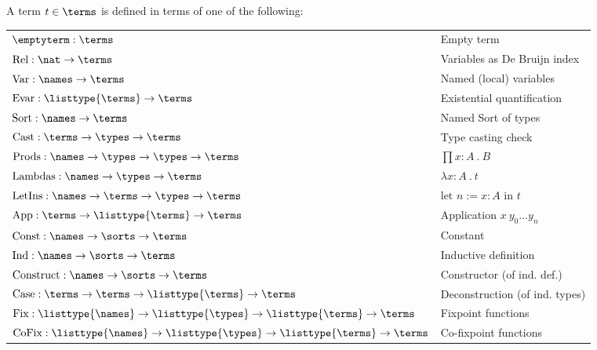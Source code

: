 \begin{definition}
	A \pcic term $t \in \terms$ is defined in terms of one of the following:

	\vspace{1em}
	\begin{tabular}{ll}
		$\emptyterm : \terms$                                        & Empty term\glsadd{emptyterm} \\
		$\text{Rel} : \nat \rightarrow \terms$                       & Variables as De Bruijn \cite{de1972lambda} index \\
		$\text{Var} : \names \rightarrow \terms$                     & Named (local) variables \\
		$\text{Evar} : \listtype{\terms} \rightarrow \terms $        & Existential quantification \\
		$\text{Sort} : \names \rightarrow \terms$                    & Named Sort of types \\
		$\text{Cast} : \terms \rightarrow \types \rightarrow \terms$ & Type casting check \\
		$\text{Prods} : \names \rightarrow \types \rightarrow \types \rightarrow \terms $ & $\prod x:A ~.~ B$ \\
		$\text{Lambdas} : \names \rightarrow \types \rightarrow \terms$   & $\lambda x:A ~.~ t$ \\
		$\text{LetIns} : \names \rightarrow \terms \rightarrow \types \rightarrow \terms$    & $\text{let~} n := x : A \text{~in~} t$ \\
		$\text{App} : \terms \rightarrow \listtype{\terms} \rightarrow \terms$ & Application $x~y_0 \ldots y_n$ \\
		$\text{Const} : \names \rightarrow \sorts \rightarrow \terms$ & Constant \\
		$\text{Ind} : \names \rightarrow \sorts \rightarrow \terms$  & Inductive definition \\
		$\text{Construct} : \names \rightarrow \sorts \rightarrow \terms$ & Constructor (of ind. def.) \\
		$\text{Case} : \terms \rightarrow \terms \rightarrow \listtype{\terms} \rightarrow \terms$ & Deconstruction (of ind. types) \\
		$\text{Fix} : \listtype{\names} \rightarrow \listtype{\types} \rightarrow \listtype{\terms} \rightarrow \terms$ & Fixpoint functions \\
		$\text{CoFix} : \listtype{\names} \rightarrow \listtype{\types} \rightarrow \listtype{\terms} \rightarrow \terms$ & Co-fixpoint functions \\
	\end{tabular}
\end{definition}

